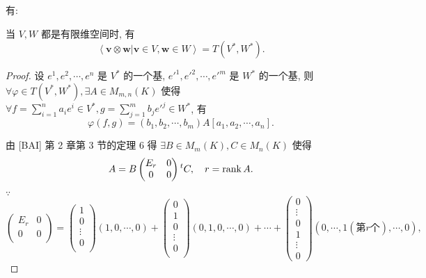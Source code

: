 \documentclass[color=black,device=normal,lang=cn,mode=geye]{elegantnote}
\begin{document}
有:
\begin{theorem}\label{t1.4}
    当 $V,W$ 都是有限维空间时, 有
    \[\left<\boldsymbol{v}\otimes\boldsymbol{w}|\boldsymbol{v}\in V,\boldsymbol{w}\in W\right>=T(V^*,W^*).\]
\end{theorem}
\begin{proof}
    设 $e^1,e^2,\cdots,e^n$ 是 $V^*$ 的一个基, $e'^1,e'^2,\cdots,e'^m$ 是 $W^*$ 的一个基, 则 $\forall \varphi\in T(V^*,W^*),\exists A\in M_{m,n}(K)$ 使得 $\forall f=\sum\limits_{i=1}^na_ie^i\in V^*,g=\sum\limits_{j=1}^mb_je'^j\in W^*$, 有
    \[\varphi(f,g)=(b_1,b_2,\cdots,b_m)A[a_1,a_2,\cdots,a_n].\]

    由 [BAI] 第 2 章第 3 节的定理 6 得 $\exists B\in M_m(K),C\in M_n(K)$ 使得
    \[A=B\begin{pmatrix}
        E_r & 0 \\
        0 & 0 \\
    \end{pmatrix}{}^tC,\quad r=\operatorname{rank} A.\]
    
    $\because$
    \[\begin{pmatrix}
        E_r & 0 \\
        0 & 0 \\
    \end{pmatrix}=\begin{pmatrix}
        1 \\
        0 \\
        \vdots \\
        0 \\
    \end{pmatrix}(1,0,\cdots,0)+\begin{pmatrix}
        0 \\
        1 \\
        0 \\
        \vdots \\
        0 \\
    \end{pmatrix}(0,1,0,\cdots,0)+\cdots+\begin{pmatrix}
        0 \\
        \vdots \\
        0 \\
        1 \\
        \vdots \\
        0
    \end{pmatrix}(0,\cdots,1(\text{第}r\text{个}),\cdots,0),\]


\end{proof}
\end{document}
